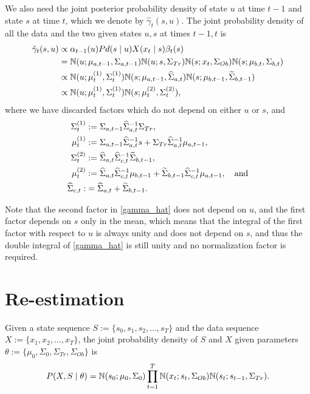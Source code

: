 \documentclass[12pt,leqno]{article}
\begin{document}
We also need the joint posterior probability density of state $u$ at time $t-1$ and state $s$ at time $t$,
which we denote by $\hat{\gamma}_t(s,u)$. The joint probability density of all the data and the two given states
  $u,s$  at times $t-1,t$ is
  \begin{align}
    \hat{\gamma}_t(s,u) &\propto \alpha_{t-1}(u)Pd(s\mid u)X(x_t\mid s)\beta_t(s) \notag\\
    &= {\mathbb N}(u;\mu_{a,t-1},\Sigma_{a,t-1}){\mathbb N}(u;s,\Sigma_{Tr})  {\mathbb N}(s;x_t,\Sigma_{Ob}){\mathbb N}(s;\mu_{b,t},\Sigma_{b,t})\notag\\
    &\propto {\mathbb N}(u;\mu^{(1)}_t,\Sigma^{(1)}_t){\mathbb N}(s;\mu_{a,t-1},\widehat{\Sigma}_{a,t}){\mathbb N}(s;\mu_{b,t-1},
    \widetilde{\Sigma}_{b,t-1})\notag\\
    &\propto {\mathbb N}(u;\mu^{(1)}_t,\Sigma^{(1)}_t){\mathbb N}(s;\mu^{(2)}_t,\Sigma^{(2)}_t),\label{gamma_hat}
  \end{align}
  where we have discarded factors which do not depend on either $u$ or $s$, and 
  \begin{align}
    \Sigma^{(1)}_t &:= \Sigma_{a,t-1}\widehat{\Sigma}_{a,t}^{-1}\Sigma_{Tr},\notag\\
    \mu^{(1)}_t &:= \Sigma_{a,t-1}\widehat{\Sigma}_{a,t}^{-1}s + \Sigma_{Tr}\widehat{\Sigma}_{a,t}^{-1}\mu_{a,t-1},\label{mu(1)}\\
    \Sigma^{(2)}_t &:= \widehat{\Sigma}_{a,t}\widehat{\Sigma}_{c,t}^{-1}\widetilde{\Sigma}_{b,t-1},\notag\\
    \mu^{(2)}_t &:= \widehat{\Sigma}_{a,t}\widehat{\Sigma}_{c,t}^{-1}\mu_{b,t-1} +
    \widetilde{\Sigma}_{b,t-1}\widehat{\Sigma}_{c,t}^{-1}\mu_{a,t-1},\notag\quad\text{and}\\
    \widehat{\Sigma}_{c,t} :&= \widehat{\Sigma}_{a,t} + \widetilde{\Sigma}_{b,t-1}.\notag
  \end{align}

  Note that the second factor in \eqref{gamma_hat} does not depend on $u$, and the first factor depends on $s$
  only in the mean, which means that the integral of the first factor with respect to $u$ is always unity
  and does not depend on $s$, and thus the double integral of \eqref{gamma_hat} is still unity and no
  normalization factor is required.
  
\section{Re-estimation}
Given a state sequence $S := \{s_0,s_1,s_2,\dots,s_T\}$ and the data sequence $X := \{x_1,x_2,\dots,x_T\}$, the
joint probability density of $S$ and $X$ given parameters $\theta := \{\mu_0,\Sigma_0,\Sigma_{Tr},\Sigma_{Ob}\}$ is
$$
P(X,S\mid\theta) = {\mathbb N}(s_0;\mu_0,\Sigma_0)\prod_{t=1}^T{\mathbb N}(x_t;s_t,\Sigma_{Ob}){\mathbb N}(s_t;s_{t-1},\Sigma_{Tr}).
$$
\end{document}
